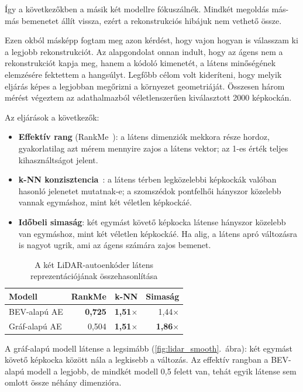 \documentclass[a4paper,12pt,oneside]{article}
\begin{document}
Így a következőkben a másik két modellre fókuszálnék. Mindkét megoldás 
más-más bemenetet állít vissza, ezért a rekonstrukciós
hibájuk nem vethető össze.  

Ezen okból másképp fogtam meg azon kérdést, hogy vajon hogyan is válasszam ki a legjobb rekonstrukciót.
Az alapgondolat onnan indult, hogy az ágens nem a rekonstrukciót kapja meg, 
hanem a kódoló kimenetét, a látens minőségének elemzésére fektettem a hangsúlyt. 
Legfőbb célom volt kideríteni, hogy melyik eljárás képes a legjobban megőrizni a környezet geometriáját. 
Összesen három mérést végeztem az adathalmazból véletlenszerűen kiválasztott 2000 képkockán. 

Az eljárások a következők:
\begin{itemize}
  \item \textbf{Effektív rang} (RankMe~\cite{garrido2023rankme}): a látens
    dimenziók mekkora része hordoz, gyakorlatilag azt mérem 
    mennyire zajos a látens vektor; az 1-es érték teljes kihasználtságot jelent.
  \item \textbf{k-NN konzisztencia}~\cite{oquab2024dinov2}: a látens térben
    legközelebbi képkockák valóban hasonló jelenetet mutatnak-e; a
    szomszédok pontfelhői hányszor közelebb vannak egymáshoz, mint két
    véletlen képkockáé.
  \item \textbf{Időbeli simaság}: két egymást követő képkocka látense
    hányszor közelebb van egymáshoz, mint két véletlen képkockáé. Ha alig, a
    látens apró változásra is nagyot ugrik, ami az ágens számára zajos
    bemenet.
\end{itemize}

\begin{table}[htbp]
  \centering
  \caption{A két LiDAR-autoenkóder látens reprezentációjának összehasonlítása}
  \label{tab:lidar_compare}
  \begin{tabular}{lrrr}
    \toprule
    Modell & RankMe & k-NN & Simaság \\
    \midrule
    BEV-alapú AE   & \textbf{0,725} & \textbf{1,51$\times$} & 1,44$\times$ \\
    Gráf-alapú AE  & 0,504 & \textbf{1,51$\times$} & \textbf{1,86$\times$} \\
    \bottomrule
  \end{tabular}
\end{table}

A gráf-alapú modell látense a legsimább
(\ref{fig:lidar_smooth}.~ábra): két egymást követő képkocka között nála a
legkisebb a változás. Az
effektív rangban a BEV-alapú modell a legjobb, de mindkét modell 0,5
felett van, tehát egyik látense sem omlott össze néhány dimenzióra.
\end{document}

